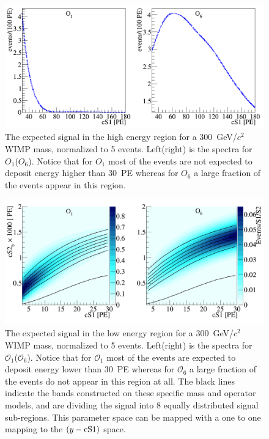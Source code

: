 \begin{figure}[h!]
\begin{minipage}{1.\linewidth}
\centerline{\includegraphics[width=1.\linewidth]{Figures/SigHighO1O6.png}}
\end{minipage}
\caption{The expected signal in the high energy region for a 300~GeV/$c^2$ WIMP mass, normalized to 5 events. Left(right) is the spectra for $O_1$($O_6$). Notice that for $O_1$ most of the events are not expected to deposit energy higher than 30~PE whereas for $O_6$ a large fraction of the events appear in this region.}
\label{fig:HighE}
\end{figure} 

\begin{figure}[h!]
\begin{minipage}{1.\linewidth}
\centerline{\includegraphics[width=1.\linewidth]{Figures/SigLowO1O6.png}}
\end{minipage}
\caption{The expected signal in the low energy region for a 300~GeV/$c^2$ WIMP mass, normalized to 5 events. Left(right) is the spectra for $\mathcal{O}_1$($\mathcal{O}_6$). Notice that for $\mathcal{O}_1$ most of the events are expected to deposit energy lower than 30~PE whereas for $\mathcal{O}_6$ a large fraction of the events do not appear in this region at all. The black lines indicate the bands constructed on these specific mass and operator models, and are dividing the signal into 8 equally distributed signal sub-regions. This parameter space can be mapped with a one to one mapping to the $(y-\mathrm{cS1})$ space.}
\label{fig:LowE}
\end{figure}




